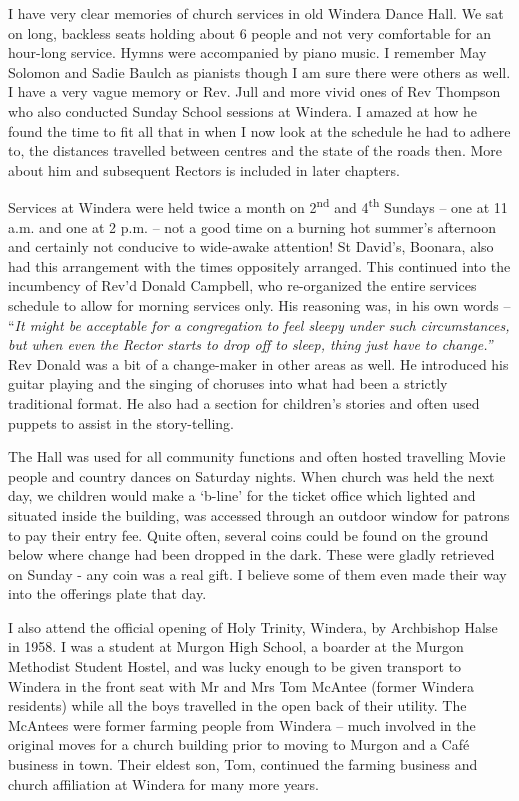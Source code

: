 I have very clear memories of church services in old Windera Dance Hall.
We sat on long, backless seats holding about 6 people and not very
comfortable for an hour-long service. Hymns were accompanied by piano
music. I remember May Solomon and Sadie Baulch as pianists though I am
sure there were others as well. I have a very vague memory or Rev. Jull
and more vivid ones of Rev Thompson who also conducted Sunday School
sessions at Windera. I amazed at how he found the time to fit all that
in when I now look at the schedule he had to adhere to, the distances
travelled between centres and the state of the roads then. More about
him and subsequent Rectors is included in later chapters.

Services at Windera were held twice a month on 2\textsuperscript{nd} and
4\textsuperscript{th} Sundays -- one at 11 a.m. and one at 2 p.m. -- not
a good time on a burning hot summer's afternoon and certainly not
conducive to wide-awake attention! St David's, Boonara, also had this
arrangement with the times oppositely arranged. This continued into the
incumbency of Rev'd Donald Campbell, who re-organized the entire
services schedule to allow for morning services only. His reasoning was,
in his own words -- ``\emph{It might be acceptable for a congregation to
feel sleepy under such circumstances, but when even the Rector starts to
drop off to sleep, thing just have to change.''} Rev Donald was a bit of
a change-maker in other areas as well. He introduced his guitar playing
and the singing of choruses into what had been a strictly traditional
format. He also had a section for children's stories and often used
puppets to assist in the story-telling.

The Hall was used for all community functions and often hosted
travelling Movie people and country dances on Saturday nights. When
church was held the next day, we children would make a `b-line' for the
ticket office which lighted and situated inside the building, was
accessed through an outdoor window for patrons to pay their entry fee.
Quite often, several coins could be found on the ground below where
change had been dropped in the dark. These were gladly retrieved on
Sunday - any coin was a real gift. I believe some of them even made
their way into the offerings plate that day.

I also attend the official opening of Holy Trinity, Windera, by
Archbishop Halse in 1958. I was a student at Murgon High School, a
boarder at the Murgon Methodist Student Hostel, and was lucky enough to
be given transport to Windera in the front seat with Mr and Mrs Tom
McAntee (former Windera residents) while all the boys travelled in the
open back of their utility. The McAntees were former farming people from
Windera -- much involved in the original moves for a church building
prior to moving to Murgon and a Café business in town. Their eldest son,
Tom, continued the farming business and church affiliation at Windera
for many more years.


